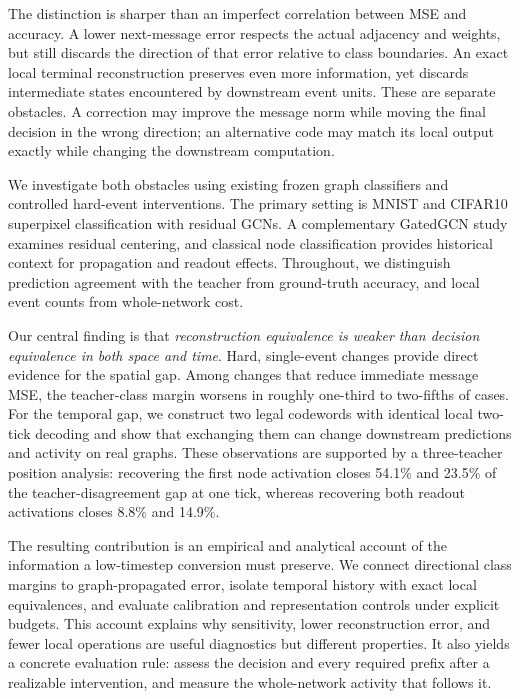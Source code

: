 \documentclass[10pt,twocolumn,letterpaper]{article}
\begin{document}
The distinction is sharper than an imperfect correlation between MSE and accuracy. A lower next-message error respects the actual adjacency and weights, but still discards the direction of that error relative to class boundaries. An exact local terminal reconstruction preserves even more information, yet discards intermediate states encountered by downstream event units. These are separate obstacles. A correction may improve the message norm while moving the final decision in the wrong direction; an alternative code may match its local output exactly while changing the downstream computation.

We investigate both obstacles using existing frozen graph classifiers and controlled hard-event interventions. The primary setting is MNIST and CIFAR10 superpixel classification with residual GCNs. A complementary GatedGCN study examines residual centering, and classical node classification provides historical context for propagation and readout effects. Throughout, we distinguish prediction agreement with the teacher from ground-truth accuracy, and local event counts from whole-network cost.

Our central finding is that \emph{reconstruction equivalence is weaker than decision equivalence in both space and time}. Hard, single-event changes provide direct evidence for the spatial gap. Among changes that reduce immediate message MSE, the teacher-class margin worsens in roughly one-third to two-fifths of cases. For the temporal gap, we construct two legal codewords with identical local two-tick decoding and show that exchanging them can change downstream predictions and activity on real graphs. These observations are supported by a three-teacher position analysis: recovering the first node activation closes 54.1\% and 23.5\% of the teacher-disagreement gap at one tick, whereas recovering both readout activations closes 8.8\% and 14.9\%.

The resulting contribution is an empirical and analytical account of the information a low-timestep conversion must preserve. We connect directional class margins to graph-propagated error, isolate temporal history with exact local equivalences, and evaluate calibration and representation controls under explicit budgets. This account explains why sensitivity, lower reconstruction error, and fewer local operations are useful diagnostics but different properties. It also yields a concrete evaluation rule: assess the decision and every required prefix after a realizable intervention, and measure the whole-network activity that follows it.
\end{document}
